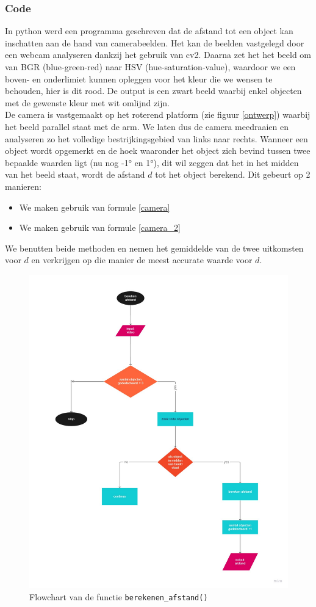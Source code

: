 \documentclass[kulak]{kulakarticle} %
\begin{document}
		\subsubsection{Code}
			In python werd een programma geschreven dat de afstand tot een object kan inschatten aan de hand van camerabeelden. Het kan de beelden vastgelegd door een webcam analyseren dankzij het gebruik van cv2. Daarna zet het het beeld om van BGR (blue-green-red) naar HSV (hue-saturation-value), waardoor we een boven- en onderlimiet kunnen opleggen voor het kleur die we wensen te behouden, hier is dit rood. De output is een zwart beeld waarbij enkel objecten met de gewenste kleur met wit omlijnd zijn.\\
			De camera is vastgemaakt op het roterend platform (zie figuur \ref{ontwerp}) waarbij het beeld parallel staat met de arm. We laten dus de camera meedraaien en analyseren zo het volledige bestrijkingsgebied van links naar rechts. Wanneer een object wordt opgemerkt en de hoek waaronder het object zich bevind tussen twee bepaalde waarden ligt (nu nog -1° en 1°), dit wil zeggen dat het in het midden van het beeld staat, wordt de afstand \(d\) tot het object berekend. Dit gebeurt op 2 manieren: 
				\begin{itemize}
					\item We maken gebruik van formule \ref{camera}
					\item We maken gebruik van formule \ref{camera_2}
				\end{itemize}
			We benutten beide methoden en nemen het gemiddelde van de twee uitkomsten voor \(d\) en verkrijgen op die manier de meest accurate waarde voor \(d\).


				\begin{figure} [!h]
					\centering
					\includegraphics[width = 0.8 \textwidth]{flowchart afstand berekenen.pdf}
				\cprotect\caption{Flowchart van de functie \verb*|berekenen_afstand()|}
				\end{figure}
 
\end{document}
